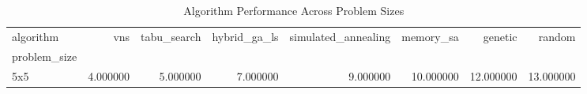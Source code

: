 \begin{table}
\caption{Algorithm Performance Across Problem Sizes}
\label{tab:scaling_analysis}
\begin{tabular}{lrrrrrrr}
\toprule
algorithm & vns & tabu_search & hybrid_ga_ls & simulated_annealing & memory_sa & genetic & random \\
problem_size &  &  &  &  &  &  &  \\
\midrule
5x5 & 4.000000 & 5.000000 & 7.000000 & 9.000000 & 10.000000 & 12.000000 & 13.000000 \\
\bottomrule
\end{tabular}
\end{table}
